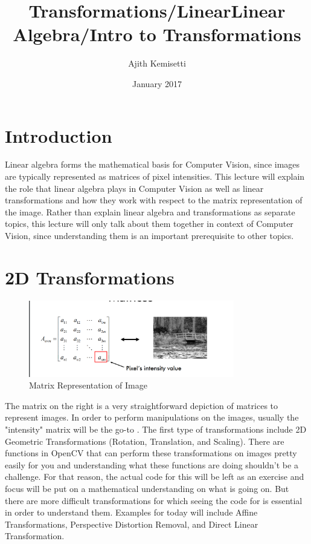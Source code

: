 \documentclass{article}
\title{Transformations/Linear}
\title{Linear Algebra/Intro to Transformations}
\author{Ajith Kemisetti}
\affil{Computer Vision Club}
\date{January 2017}
\begin{document}
\maketitle

\section{Introduction}

Linear algebra forms the mathematical basis for Computer Vision, since images are typically represented as matrices of pixel intensities. This lecture will explain the role that linear algebra plays in Computer Vision as well as linear transformations and how they work with respect to the matrix representation of the image. Rather than explain linear algebra and transformations as separate topics, this lecture will only talk about them together in context of Computer Vision, since understanding them is an important prerequisite to other topics.

\section{2D Transformations}

\begin{figure}
  \begin{center}
    \includegraphics[width=0.8\textwidth]{matrixIntensity.png}
  \end{center}
  \caption{Matrix Representation of Image}
\end{figure}
The matrix on the right is a very straightforward depiction of matrices to represent images. In order to perform manipulations on the images, usually the "intensity" matrix will be the go-to . The first type of transformations include 2D Geometric Transformations (Rotation, Translation, and Scaling). There are functions in OpenCV that can perform these transformations on images pretty easily for you and understanding what these functions are doing shouldn't be a challenge. For that reason, the actual code for this will be left as an exercise and focus will be put on a mathematical understanding on what is going on. But there are more difficult transformations for which seeing the code for is essential in order to understand them. Examples for today will include Affine Transformations, Perspective Distortion Removal, and Direct Linear Transformation. 
\end{document}
